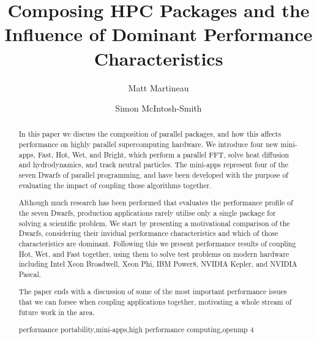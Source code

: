 \documentclass[runningheads,a4paper]{llncs}
\newcommand{\keywords}[1]{\par\addvspace\baselineskip
\noindent\keywordname\enspace\ignorespaces#1}
\begin{document}
\mainmatter  %

\title{Composing HPC Packages and the Influence of Dominant Performance Characteristics}


\author{Matt Martineau \and Simon McIntosh-Smith}
%


%
%

\maketitle


\begin{abstract}
  In this paper we discuss the composition of parallel packages, and how this affects performance on highly parallel supercomputing hardware. We introduce four new mini-apps, Fast, Hot, Wet, and Bright, which perform a parallel FFT, solve heat diffusion and hydrodynamics, and track neutral particles. The mini-apps represent four of the seven Dwarfs of parallel programming, and have been developed with the purpose of evaluating the impact of coupling those algorithms together.

  Although much research has been performed that evaluates the performance profile of the seven Dwarfs, production applications rarely utilise only a single package for solving a scientific problem. We start by presenting a motivational comparison of the Dwarfs, considering their invidual performance characteristics and which of those characteristics are dominant. Following this we present performance results of coupling Hot, Wet, and Fast together, using them to solve test problems on modern hardware including Intel Xeon Broadwell, Xeon Phi, IBM Power8, NVIDIA Kepler, and NVIDIA Pascal.

  The paper ends with a discussion of some of the most important performance issues that we can forsee when coupling applications together, motivating a whole stream of future work in the area.

  \keywords{performance portability,mini-apps,high performance computing,openmp 4}
\end{abstract}
\end{document}
